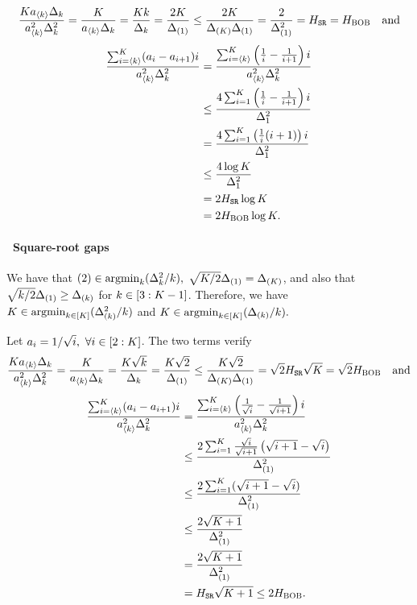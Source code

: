 \[
\frac{
	Ka_{\langle k \rangle}\Delta_{k}}
{a^2_{\langle k \rangle}\Delta^2_{k}}
=
\frac{
	K}{a_{\langle k \rangle}\Delta_{k}}
=
\frac{
	K k}{\Delta_{k}}
=
\frac{
	2K }{\Delta_{(1)}}
\leq
\frac{
	2K }{\Delta_{(K)}\Delta_{(1)}}
=
\frac{
	2}{\Delta^2_{(1)}}
=
H_{{\normalfont \texttt{SR}}}
=
H_{{\normalfont \textsc{{BOB}}}} \quad \text{and}
\]
\begin{align*}
\frac{
	\sum_{i=\langle k\rangle}^{K}
	(a_{i}-a_{i+1})
	i
}{a^2_{\langle k\rangle}\Delta^2_{k}}
&	=
\frac{
	\sum_{i=\langle k\rangle}^{K}
	\left(\frac{1}{i}-\frac{1}{i+1}\right)
	i
}{a^2_{\langle k \rangle}\Delta^2_{k}}\\
&\leq
\frac{
	4	\sum_{i=1}^{K}
	\left(\frac{1}{i}-\frac{1}{i+1}\right)
	i
}{\Delta^2_{1}}\\
&	=
\frac{
	4	\sum_{i=1}^{K}
	\left(\frac{1}{i}(i+1)\right)
	i
}{\Delta^2_{1}}\\
&\leq
\frac{
	4	\log K
}{\Delta^2_{1}}\\
&=
2	H_{{\normalfont \texttt{SR}}}	\log K\\
&=
2	H_{{\normalfont \textsc{{BOB}}}}	\log K.
\end{align*}
%
\paragraph{\raisebox{.04cm}{\textcolor{bull}{$\blacktriangleright$}}~Square-root gaps} We have that $(2)\in\mathrm{argmin}_k (\Delta^2_k/k),$
$\sqrt{K/2}\Delta_{(1)}=\Delta_{(K)}$, and also that
$\sqrt{k/2}\Delta_{(1)}\geq\Delta_{(k)}$ for $k\in[3:K-1]$. 
Therefore, we have $K\in\mathrm{argmin}_{k\in[K]} (\Delta^2_{(k)}/k)$ and $K\in\mathrm{argmin}_{k\in[K]} (\Delta_{(k)}/k).$

\smallskip
\noindent 
Let $a_i = 1/\sqrt{i},~ \forall i \in[2:K]$.  The two terms verify
\[
\frac{
	Ka_{\langle k\rangle}\Delta_{k}}
{a^2_{\langle k \rangle}\Delta^2_{k}}
=
\frac{
	K}{a_{\langle k\rangle}\Delta_{k}}
=
\frac{
	K \sqrt{k}}{\Delta_{k}}
=
\frac{
	K \sqrt{2}}{\Delta_{(1)}}
\leq
\frac{
	K \sqrt{2}}{\Delta_{(K)}\Delta_{(1)}}
=
\sqrt{2}	H_{{\normalfont \texttt{SR}}}\sqrt{K}
=
\sqrt{2}	H_{{\normalfont \textsc{{BOB}}}} \quad \text{and}
\] 
\begin{align*}		
\frac{
	\sum_{i=\langle k\rangle}^{K}
	(a_{i}-a_{i+1})
	i
}{a^2_{\langle k\rangle}\Delta^2_{k}}
&	=
\frac{
	\sum_{i=\langle k\rangle}^{K}
	\left(\frac{1}{\sqrt{i}}-\frac{1}{\sqrt{i+1}}\right)
	i
}{a^2_{\langle k\rangle}\Delta^2_{k}}\\
&\leq
\frac{
	2	\sum_{i=1}^{K}
	\frac{\sqrt{i}}{\sqrt{i+1}}	\left(\sqrt{i+1}-\sqrt{i}\right)
}{\Delta^2_{(1)}}\\
&	\leq
\frac{2
	\sum_{i=1}^{K}
	(\sqrt{i+1}-\sqrt{i})	
}{\Delta^2_{(1)}}\\
&\leq
\frac{
	2	\sqrt{K+1}	
}{\Delta^2_{(1)}}\\
&		=
\frac{
	2	\sqrt{K+1}	
}{\Delta^2_{(1)}}\\
&=
H_{{\normalfont \texttt{SR}}}		\sqrt{K+1}	
\leq
2H_{{\normalfont \textsc{{BOB}}}}.
\end{align*}
